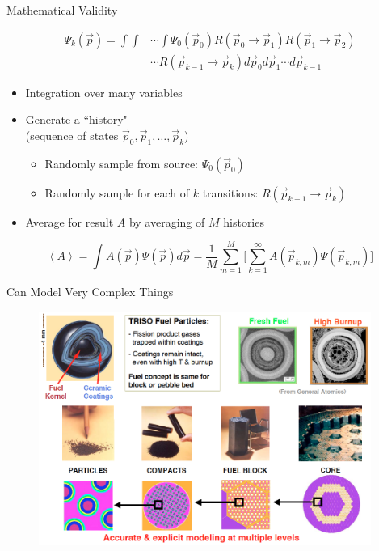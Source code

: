 \documentclass[xcolor=x11names,compress]{beamer}
\renewcommand{\(}{\begin{columns}}
\renewcommand{\)}{\end{columns}}
\newcommand{\<}[1]{\begin{column}{#1}}
\renewcommand{\>}{\end{column}}
\begin{document}
\begin{frame}{Mathematical Validity}

\begin{align*}
\Psi_{k}(\vec{p}) = \int\int &\cdots \int \Psi_{0}(\vec{p}_{0}) R(\vec{p}_{0} \rightarrow \vec{p}_{1})R(\vec{p}_{1} \rightarrow \vec{p}_{2}) \\&\cdots R(\vec{p}_{k-1} \rightarrow \vec{p}_{k}) d\vec{p}_{0} d\vec{p}_{1} \cdots d\vec{p}_{k-1}
\end{align*}

\begin{itemize}
\item Integration over many variables
\hspace*{0.5 em}
\item Generate a ``history"\\
(sequence of states $\vec{p}_0, \vec{p}_1 , \dots, \vec{p}_k$)
\begin{itemize}
 \item Randomly sample from source: $\Psi_0 (\vec{p}_0)$
 \item Randomly sample for each of $k$ transitions: $R(\vec{p}_{k-1} \rightarrow \vec{p}_{k})$
\end{itemize}
\pause
\item Average for result $A$ by averaging of $M$ histories
\end{itemize}

\[\left\langle A \right\rangle = \int A(\vec{p})\Psi(\vec{p}) d\vec{p} 
= \frac{1}{M} \sum_{m=1}^M \biggl[ \sum_{k=1}^{\infty} A(\vec{p}_{k,m}) \Psi(\vec{p}_{k,m}) \biggr] \]

\end{frame}


\begin{frame}{Can Model Very Complex Things}

  	\begin{figure}
  	\begin{center}
  		\includegraphics[height=3in,clip]{pbmr}
	\end{center}
  	\end{figure}

\end{frame}
\end{document}
